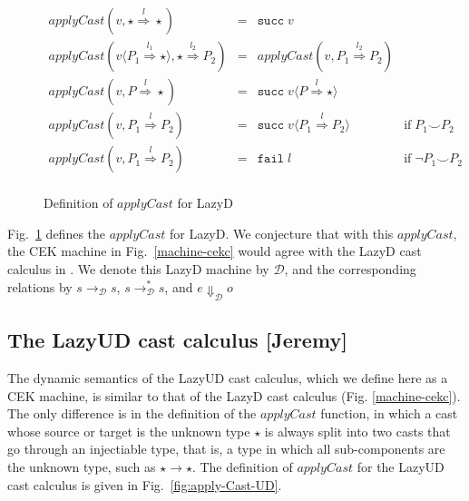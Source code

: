\documentclass[acmsmall,review,anonymous]{acmart}\settopmatter{printfolios=true,printccs=false,printacmref=false}
\newcommand{\figref}[1]{Fig.~\ref{#1}}
\newcommand{\funrule}[3]{#1 &=& #2 & #3\\}
\newcommand{\lazyUD}{Lazy\;UD}
\newcommand{\lazyD}{Lazy\;D}
\newcommand{\cOOcast}[3]{#1 \overset{#2}{\Rightarrow} #3}
\newcommand{\vOOcast}[2]{#1\langle#2\rangle}
\newcommand{\rOOsucc}[1]{\mathtt{succ}\;#1}
\newcommand{\rOOfail}[1]{\mathtt{fail}\;#1}
\newcommand{\sidecond}[1]{\text{if}\;#1}
\newcommand{\ineffCEKD}{$ \mathcal{D} $}
\newcommand{\judgeDreduce}[2]{#1 \longrightarrow_{\mathcal{D}} #2}
\newcommand{\judgeDreduceTrans}[2]{#1 \longrightarrow_{\mathcal{D}}^{*} #2}
\newcommand{\judgeDeval}[2]{#1 \Downarrow_{\mathcal{D}} #2}
\begin{document}
\begin{figure}
	
	\[
	\begin{array}{rclr}
	\funrule{
		applyCast(v,\cOOcast{\star}{l}{\star})
	}{
		\rOOsucc{v}
	}{}
	\funrule{
		applyCast(\vOOcast{v}{\cOOcast{P_1}{l_1}{\star}},\cOOcast{\star}{l_2}{P_2})
	}{
		applyCast(v,\cOOcast{P_1}{l_2}{P_2})
	}{}
	\funrule{
		applyCast(v,\cOOcast{P}{l}{\star})
	}{
		\rOOsucc{\vOOcast{v}{\cOOcast{P}{l}{\star}}}
	}{}
	\funrule{
		applyCast(v,\cOOcast{P_1}{l}{P_2})
	}{
		\rOOsucc{\vOOcast{v}{\cOOcast{P_1}{l}{P_2}}}
	}{\sidecond{P_1 \smile P_2}}
	\funrule{
		applyCast(v,\cOOcast{P_1}{l}{P_2})
	}{
		\rOOfail{l}
	}{\sidecond{\neg P_1 \smile P_2}}
	
	\end{array}
	\]
	\caption{Definition of $ applyCast $ for \lazyD}
	\label{fig:applyCast-D-C}
\end{figure}

\figref{fig:applyCast-D-C} defines the $ applyCast $ for \lazyD. 
We conjecture that with this $ applyCast $, the CEK machine in 
\figref{machine-cekc} would agree with the \lazyD{} cast calculus in 
\citet{siek2009exploring}. We denote this \lazyD{} machine by \ineffCEKD{},
and the corresponding relations by $ \judgeDreduce{s}{s} $, $ 
\judgeDreduceTrans{s}{s} $, and $ \judgeDeval{e}{o} $

\subsection{The \lazyUD{} cast calculus [Jeremy]}

The dynamic semantics of the \lazyUD{} cast calculus, which we define here as a
CEK machine, is similar to that of the \lazyD{} cast calculus
(Fig. \ref{machine-cekc}). The only difference is in the definition of
the $\mathit{applyCast}$ function, in which a cast whose source or
target is the unknown type $\star$ is always split into two casts that
go through an injectiable type, that is, a type in which all
sub-components are the unknown type, such as $\star \to \star$. The
definition of $\mathit{applyCast}$ for the \lazyUD{} cast calculus is given in
Fig.~\ref{fig:apply-Cast-UD}.
\end{document}
